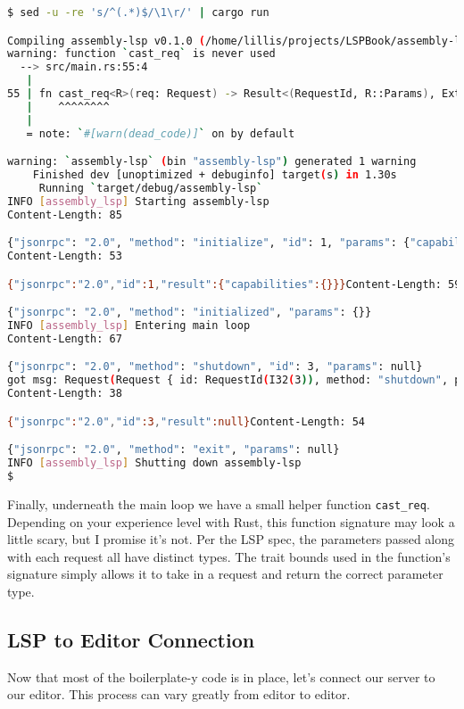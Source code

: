 \begin{lstlisting}[language=bash]
$ sed -u -re 's/^(.*)$/\1\r/' | cargo run

Compiling assembly-lsp v0.1.0 (/home/lillis/projects/LSPBook/assembly-lsp)
warning: function `cast_req` is never used
  --> src/main.rs:55:4
   |
55 | fn cast_req<R>(req: Request) -> Result<(RequestId, R::Params), ExtractError<Request>>
   |    ^^^^^^^^
   |
   = note: `#[warn(dead_code)]` on by default

warning: `assembly-lsp` (bin "assembly-lsp") generated 1 warning
    Finished dev [unoptimized + debuginfo] target(s) in 1.30s
     Running `target/debug/assembly-lsp`
INFO [assembly_lsp] Starting assembly-lsp
Content-Length: 85

{"jsonrpc": "2.0", "method": "initialize", "id": 1, "params": {"capabilities": {}}}
Content-Length: 53

{"jsonrpc":"2.0","id":1,"result":{"capabilities":{}}}Content-Length: 59

{"jsonrpc": "2.0", "method": "initialized", "params": {}}
INFO [assembly_lsp] Entering main loop
Content-Length: 67

{"jsonrpc": "2.0", "method": "shutdown", "id": 3, "params": null}
got msg: Request(Request { id: RequestId(I32(3)), method: "shutdown", params: Null })
Content-Length: 38

{"jsonrpc":"2.0","id":3,"result":null}Content-Length: 54

{"jsonrpc": "2.0", "method": "exit", "params": null}
INFO [assembly_lsp] Shutting down assembly-lsp
$
\end{lstlisting}

Finally, underneath the main loop we have a small helper function
\texttt{cast\_req}. Depending on your experience level with Rust, this function signature
may look a little scary, but I promise it's not. Per the LSP spec, the parameters
passed along with each request all have distinct types. The trait bounds used in
the function's signature simply allows it to take in a request and return the correct
parameter type.

\subsection{LSP to Editor Connection}

Now that most of the boilerplate-y code is in place, let's connect
our server to our editor. This process can vary greatly from editor to editor.

